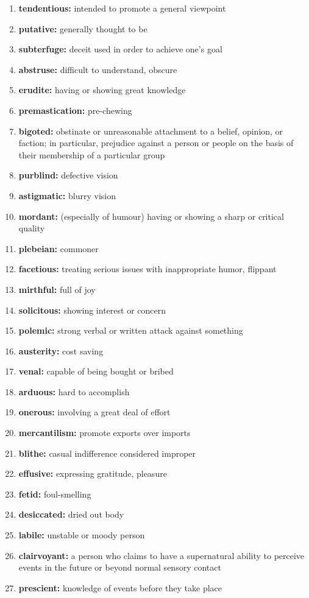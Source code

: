 \documentclass{article}
\begin{document}
\begin{enumerate}
    \item \textbf{tendentious: }{intended to promote a general viewpoint}
    \item \textbf{putative: }{generally thought to be}
    \item \textbf{subterfuge: }{deceit used in order to achieve one's goal}
    \item \textbf{abstruse: }{difficult to understand, obscure}
    \item \textbf{erudite: }{having or showing great knowledge}
    \item \textbf{premastication: }{pre-chewing}
    \item \textbf{bigoted: }{obstinate or unreasonable attachment to a belief, opinion, or faction; in particular, prejudice against a person or people on the basis of their membership of a particular group}
    \item \textbf{purblind: }{defective vision}
    \item \textbf{astigmatic: }{blurry vision}
    \item \textbf{mordant: }{(especially of humour) having or showing a sharp or critical quality}
    \item \textbf{plebeian: }{commoner}
    \item \textbf{facetious: }{treating serious issues with inappropriate humor, flippant}
    \item \textbf{mirthful: }{full of joy}
    \item \textbf{solicitous: }{showing interest or concern}
    \item \textbf{polemic: }{strong verbal or written attack against something}
    \item \textbf{austerity: }{cost saving}
    \item \textbf{venal: }{capable of being bought or bribed}
    \item \textbf{arduous: }{hard to accomplish}
    \item \textbf{onerous: }{involving a great deal of effort}
    \item \textbf{mercantilism: }{promote exports over imports}
    \item \textbf{blithe: }{casual indifference considered improper}
    \item \textbf{effusive: }{expressing gratitude, pleasure}
    \item \textbf{fetid: }{foul-smelling}
    \item \textbf{desiccated: }{dried out body}
    \item \textbf{labile: }{unstable or moody person}
    \item \textbf{clairvoyant: }{a person who claims to have a supernatural ability to perceive events in the future or beyond normal sensory contact}
    \item \textbf{prescient: }{knowledge of events before they take place}
    
\end{enumerate}
\end{document}
